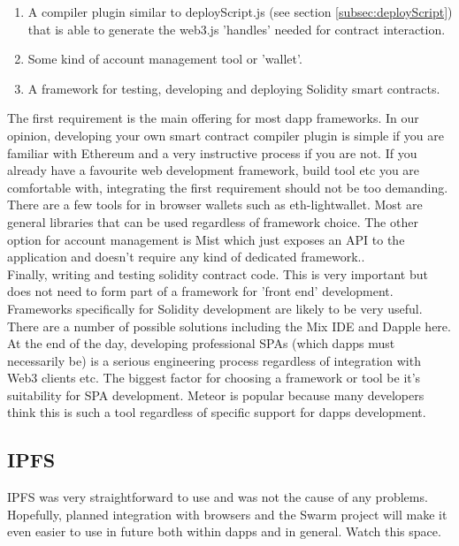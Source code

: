 \begin{enumerate}
\item A compiler plugin similar to deployScript.js (see section \ref{subsec:deployScript}) that is able to generate the web3.js 'handles' needed for contract interaction.
\item Some kind of account management tool or 'wallet'.
\item A framework for testing, developing and deploying Solidity smart contracts. 
\end{enumerate}

The first requirement is the main offering for most dapp frameworks. In our opinion, developing your own smart contract compiler plugin is simple if you are familiar with Ethereum and a very instructive process if you are not. If you already have a favourite web development framework, build tool etc you are comfortable with, integrating the first requirement should not be too demanding.\\

There are a few tools for in browser wallets such as eth-lightwallet\cite{ethLightwallet}. Most are general libraries that can be used regardless of framework choice. The other option for account management is Mist which just exposes an API to the application and doesn't require any kind of dedicated framework..\\

Finally, writing and testing solidity contract code. This is very important but does not need to form part of a framework for 'front end' development. Frameworks specifically for Solidity development are likely to be very useful. There are a number of possible solutions including the Mix IDE and Dapple here.\\

At the end of the day, developing professional SPAs (which dapps must necessarily be) is a serious engineering process regardless of integration with Web3 clients etc. The biggest factor for choosing a framework or tool be it's suitability for SPA development. Meteor is popular because many developers think this is such a tool regardless of specific support for dapps development.\\

\subsection{IPFS}
IPFS was very straightforward to use and was not the cause of any problems. Hopefully, planned integration with browsers and the Swarm project will make it even easier to use in future both within dapps and in general. Watch this space.\\

